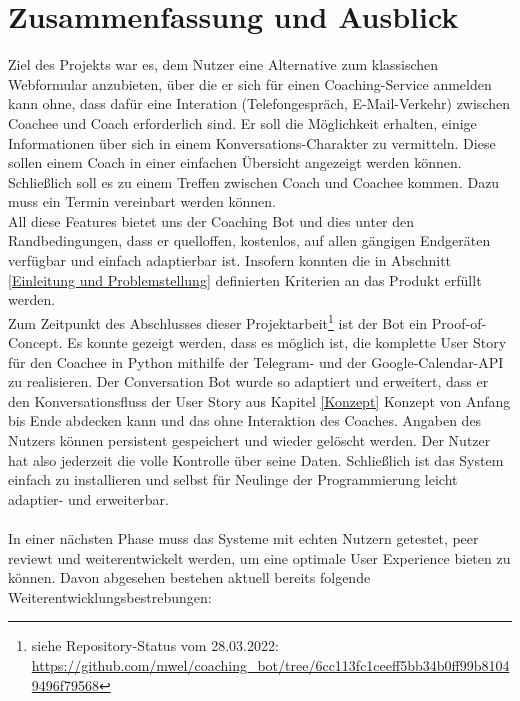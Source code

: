 \label{Zusammenfassung und Ausblick}
\chapter{Zusammenfassung und Ausblick}

    Ziel des Projekts war es, dem Nutzer eine Alternative zum klassischen Webformular anzubieten, über die er sich für einen Coaching-Service anmelden kann ohne, dass dafür eine Interation (Telefongespräch, E-Mail-Verkehr) zwischen Coachee und Coach erforderlich sind. Er soll die Möglichkeit erhalten, einige Informationen über sich in einem Konversations-Charakter zu vermitteln. Diese sollen einem Coach in einer einfachen Übersicht angezeigt werden können. Schließlich soll es zu einem Treffen zwischen Coach und Coachee kommen. Dazu muss ein Termin vereinbart werden können. \\
    All diese Features bietet uns der Coaching Bot und dies unter den Randbedingungen, dass er quelloffen, kostenlos, auf allen gängigen Endgeräten verfügbar und einfach adaptierbar ist. Insofern konnten die in Abschnitt \ref*{Einleitung und Problemstellung} definierten Kriterien an das Produkt erfüllt werden. \\
    
    Zum Zeitpunkt des Abschlusses dieser Projektarbeit\footnote{siehe Repository-Status vom 28.03.2022: \url{https://github.com/mwel/coaching_bot/tree/6cc113fc1ceeff5bb34b0ff99b81049496f79568}} ist der Bot ein Proof-of-Concept. Es konnte gezeigt werden, dass es möglich ist, die komplette User Story für den Coachee in Python mithilfe der Telegram- und der Google-Calendar-API zu realisieren. Der Conversation Bot wurde so adaptiert und erweitert, dass er den Konversationsfluss der User Story aus Kapitel \ref*{Konzept} Konzept von Anfang bis Ende abdecken kann und das ohne Interaktion des Coaches. Angaben des Nutzers können persistent gespeichert und wieder gelöscht werden. Der Nutzer hat also jederzeit die volle Kontrolle über seine Daten. Schließlich ist das System einfach zu installieren und selbst für Neulinge der Programmierung leicht adaptier- und erweiterbar.\\
    \\
    In einer nächsten Phase muss das Systeme mit echten Nutzern getestet, peer reviewt und weiterentwickelt werden, um eine optimale User Experience bieten zu können. Davon abgesehen bestehen aktuell bereits folgende Weiterentwicklungsbestrebungen: 

